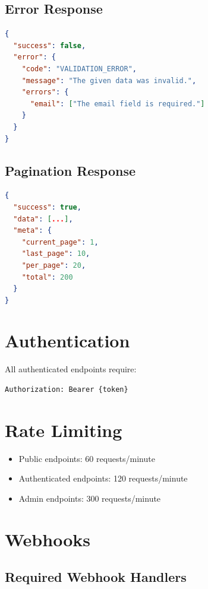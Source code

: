 \documentclass[11pt,a4paper]{article}
\begin{document}
\subsection{Error Response}
\begin{lstlisting}[language=json]
{
  "success": false,
  "error": {
    "code": "VALIDATION_ERROR",
    "message": "The given data was invalid.",
    "errors": {
      "email": ["The email field is required."]
    }
  }
}
\end{lstlisting}

\subsection{Pagination Response}
\begin{lstlisting}[language=json]
{
  "success": true,
  "data": [...],
  "meta": {
    "current_page": 1,
    "last_page": 10,
    "per_page": 20,
    "total": 200
  }
}
\end{lstlisting}

\section{Authentication}

All authenticated endpoints require:
\begin{lstlisting}
Authorization: Bearer {token}
\end{lstlisting}

\section{Rate Limiting}

\begin{itemize}
    \item Public endpoints: 60 requests/minute
    \item Authenticated endpoints: 120 requests/minute
    \item Admin endpoints: 300 requests/minute
\end{itemize}

\section{Webhooks}

\subsection{Required Webhook Handlers}
\end{document}
